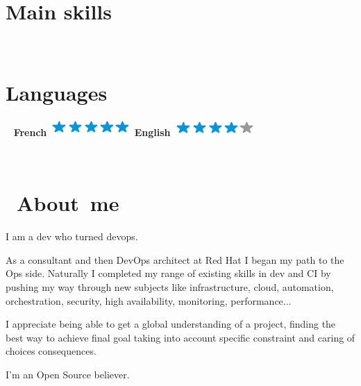 \documentclass[]{friggeri-cv}
\begin{document}
\begin{aside}
    \section{Main skills}
    ~
    ~
    ~
    \section{Languages}
    ~
    \textbf{French}\includegraphics[scale=0.40]{img/5stars.png}\vspace{4pt}
    \textbf{English}\includegraphics[scale=0.40]{img/4stars.png}
    ~    
\end{aside}
~
\newlength{\parsepsave}
\section{\ About\ me} 
 \qquad I am a dev who turned devops. 
 
 \vspace{-4pt}
 \qquad  As a consultant and then DevOps architect at Red Hat I began my path to the Ops side. Naturally I completed my range of existing skills in dev and CI by pushing my way through new subjects like infrastructure, cloud, automation, orchestration, security, high availability, monitoring, performance...
 
 \vspace{-4pt}
 \qquad   I appreciate being able to get a global understanding of a project, finding the best way to achieve final goal taking into account specific constraint and caring of choices consequences. 
 
 \vspace{-4pt}
 \qquad  I'm an Open Source believer.  
\end{document}
